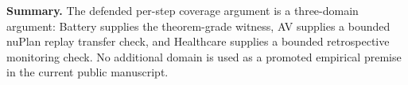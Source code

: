 \medskip
\noindent\textbf{Summary.}  The defended per-step coverage argument is a
three-domain argument: Battery supplies the theorem-grade witness, AV supplies a
bounded nuPlan replay transfer check, and Healthcare supplies a bounded
retrospective monitoring check.  No additional domain is used as a promoted
empirical premise in the current public manuscript.
